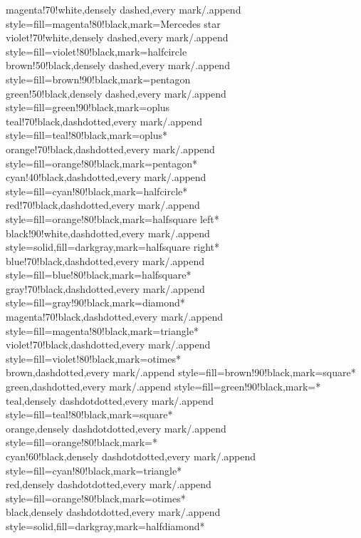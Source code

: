 \documentclass[a4paper]{article}
\begin{document}
{	magenta!70!white,densely dashed,every mark/.append style={fill=magenta!80!black},mark=Mercedes star\\
	violet!70!white,densely dashed,every mark/.append style={fill=violet!80!black},mark=halfcircle\\
	brown!50!black,densely dashed,every mark/.append style={fill=brown!90!black},mark=pentagon\\
	green!50!black,densely dashed,every mark/.append style={fill=green!90!black},mark=oplus\\
	teal!70!black,dashdotted,every mark/.append style={fill=teal!80!black},mark=oplus*\\
	orange!70!black,dashdotted,every mark/.append style={fill=orange!80!black},mark=pentagon*\\
	cyan!40!black,dashdotted,every mark/.append style={fill=cyan!80!black},mark=halfcircle*\\
	red!70!black,dashdotted,every mark/.append style={fill=orange!80!black},mark=halfsquare left*\\
	black!90!white,dashdotted,every mark/.append style={solid,fill=darkgray},mark=halfsquare right*\\
	blue!70!black,dashdotted,every mark/.append style={fill=blue!80!black},mark=halfsquare*\\
	gray!70!black,dashdotted,every mark/.append style={fill=gray!90!black},mark=diamond*\\
	magenta!70!black,dashdotted,every mark/.append style={fill=magenta!80!black},mark=triangle*\\
	violet!70!black,dashdotted,every mark/.append style={fill=violet!80!black},mark=otimes*\\
	brown,dashdotted,every mark/.append style={fill=brown!90!black},mark=square*\\
	green,dashdotted,every mark/.append style={fill=green!90!black},mark=*\\
	teal,densely dashdotdotted,every mark/.append style={fill=teal!80!black},mark=square*\\
	orange,densely dashdotdotted,every mark/.append style={fill=orange!80!black},mark=*\\
	cyan!60!black,densely dashdotdotted,every mark/.append style={fill=cyan!80!black},mark=triangle*\\
	red,densely dashdotdotted,every mark/.append style={fill=orange!80!black},mark=otimes*\\
	black,densely dashdotdotted,every mark/.append style={solid,fill=darkgray},mark=halfdiamond*\\
}
\end{document}
